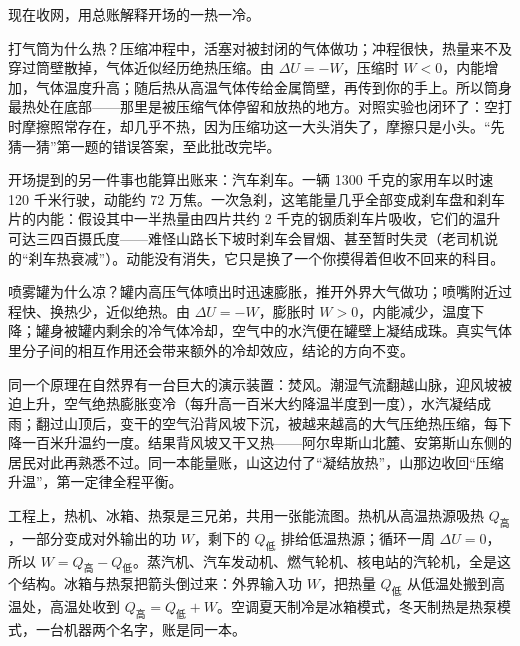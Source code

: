 \begin{mainline}
现在收网，用总账解释开场的一热一冷。

打气筒为什么热？压缩冲程中，活塞对被封闭的气体做功；冲程很快，热量来不及穿过筒壁散掉，气体近似经历绝热压缩。由 \(\Delta U=-W\)，压缩时 \(W<0\)，内能增加，气体温度升高；随后热从高温气体传给金属筒壁，再传到你的手上。所以筒身最热处在底部——那里是被压缩气体停留和放热的地方。对照实验也闭环了：空打时摩擦照常存在，却几乎不热，因为压缩功这一大头消失了，摩擦只是小头。“先猜一猜”第一题的错误答案，至此批改完毕。

开场提到的另一件事也能算出账来：汽车刹车。一辆 1300 千克的家用车以时速 120 千米行驶，动能约 \(72\) 万焦。一次急刹，这笔能量几乎全部变成刹车盘和刹车片的内能：假设其中一半热量由四片共约 2 千克的钢质刹车片吸收，它们的温升可达三四百摄氏度——难怪山路长下坡时刹车会冒烟、甚至暂时失灵（老司机说的“刹车热衰减”）。动能没有消失，它只是换了一个你摸得着但收不回来的科目。

喷雾罐为什么凉？罐内高压气体喷出时迅速膨胀，推开外界大气做功；喷嘴附近过程快、换热少，近似绝热。由 \(\Delta U=-W\)，膨胀时 \(W>0\)，内能减少，温度下降；罐身被罐内剩余的冷气体冷却，空气中的水汽便在罐壁上凝结成珠。真实气体里分子间的相互作用还会带来额外的冷却效应，结论的方向不变。

同一个原理在自然界有一台巨大的演示装置：焚风。潮湿气流翻越山脉，迎风坡被迫上升，空气绝热膨胀变冷（每升高一百米大约降温半度到一度），水汽凝结成雨；翻过山顶后，变干的空气沿背风坡下沉，被越来越高的大气压绝热压缩，每下降一百米升温约一度。结果背风坡又干又热——阿尔卑斯山北麓、安第斯山东侧的居民对此再熟悉不过。同一本能量账，山这边付了“凝结放热”，山那边收回“压缩升温”，第一定律全程平衡。

工程上，热机、冰箱、热泵是三兄弟，共用一张能流图。热机从高温热源吸热 \(Q_{\text{高}}\)，一部分变成对外输出的功 \(W\)，剩下的 \(Q_{\text{低}}\) 排给低温热源；循环一周 \(\Delta U=0\)，所以 \(W=Q_{\text{高}}-Q_{\text{低}}\)。蒸汽机、汽车发动机、燃气轮机、核电站的汽轮机，全是这个结构。冰箱与热泵把箭头倒过来：外界输入功 \(W\)，把热量 \(Q_{\text{低}}\) 从低温处搬到高温处，高温处收到 \(Q_{\text{高}}=Q_{\text{低}}+W\)。空调夏天制冷是冰箱模式，冬天制热是热泵模式，一台机器两个名字，账是同一本。
\end{mainline}

